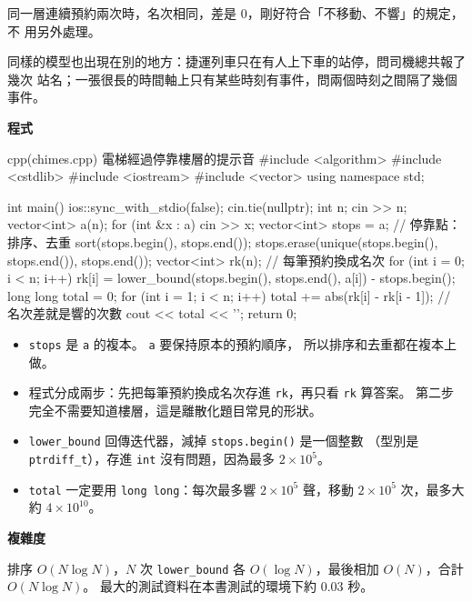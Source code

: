 同一層連續預約兩次時，名次相同，差是 $0$，剛好符合「不移動、不響」的規定，不
用另外處理。

同樣的模型也出現在別的地方：捷運列車只在有人上下車的站停，問司機總共報了幾次
站名；一張很長的時間軸上只有某些時刻有事件，問兩個時刻之間隔了幾個事件。

\textbf{程式}

\begin{example}[label=ex:srt-chimes]{cpp}{(chimes.cpp) 電梯經過停靠樓層的提示音}
#include <algorithm>
#include <cstdlib>
#include <iostream>
#include <vector>
using namespace std;

int main() {
    ios::sync_with_stdio(false);
    cin.tie(nullptr);
    int n;
    cin >> n;
    vector<int> a(n);
    for (int &x : a) {
        cin >> x;
    }
    vector<int> stops = a;                      // 停靠點：排序、去重
    sort(stops.begin(), stops.end());
    stops.erase(unique(stops.begin(), stops.end()), stops.end());
    vector<int> rk(n);                          // 每筆預約換成名次
    for (int i = 0; i < n; i++) {
        rk[i] = lower_bound(stops.begin(), stops.end(), a[i]) - stops.begin();
    }
    long long total = 0;
    for (int i = 1; i < n; i++) {
        total += abs(rk[i] - rk[i - 1]);        // 名次差就是響的次數
    }
    cout << total << '\n';
    return 0;
}
\end{example}


\begin{itemize}
\item \texttt{stops} 是 \texttt{a} 的複本。 \texttt{a} 要保持原本的預約順序，
所以排序和去重都在複本上做。
\item 程式分成兩步：先把每筆預約換成名次存進 \texttt{rk}，再只看 \texttt{rk}
算答案。 第二步完全不需要知道樓層，這是離散化題目常見的形狀。
\item \texttt{lower\_bound} 回傳迭代器，減掉 \texttt{stops.begin()} 是一個整數
（型別是 \texttt{ptrdiff\_t}），存進 \texttt{int} 沒有問題，因為最多 $2 \times
10^5$。
\item \texttt{total} 一定要用 \texttt{long long}：每次最多響 $2 \times 10^5$
聲，移動 $2 \times 10^5$ 次，最多大約 $4 \times 10^{10}$。
\end{itemize}

\textbf{複雜度}

排序 $O(N \log N)$，$N$ 次 \texttt{lower\_bound} 各 $O(\log N)$，最後相加
$O(N)$，合計 $O(N \log N)$。 最大的測試資料在本書測試的環境下約 $0.03$ 秒。

